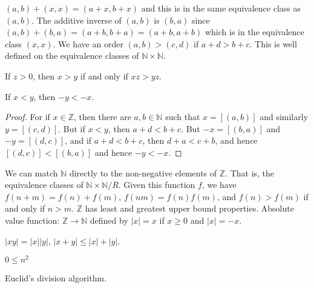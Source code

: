 \documentclass{book}                                                           %
\begin{document}
        $(a,b)+(x,x)=(a+x,b+x)$ and this is in the same equivalence class as
        $(a,b)$. The additive inverse of $(a,b)$ is $(b,a)$ since
        $(a,b)+(b,a)=(a+b,b+a)=(a+b,a+b)$ which is in the equivalence class
        $(x,x)$. We have an order $(a,b)>(c,d)$ if $a+d>b+c$. This is well
        defined on the equivalence classes of $\mathbb{N}\times\mathbb{N}$.
        \begin{theorem}
            If $z>0$, then $x>y$ if and only if $xz>yz$.
        \end{theorem}
        \begin{theorem}
            If $x<y$, then $\minus{y}<\minus{x}$.
        \end{theorem}
        \begin{proof}
            For if $x\in\mathbb{Z}$, then there are $a,b\in\mathbb{N}$ such
            that $x=[(a,b)]$ and similarly $y=[(c,d)]$. But if
            $x<y$, then $a+d<b+c$. But $\minus{x}=[(b,a)]$ and
            $\minus{y}=[(d,c)]$, and if $a+d<b+c$, then $d+a<c+b$, and hence
            $[(d,c)]<[(b,a)]$ and hence $\minus{y}<\minus{x}$.
        \end{proof}
        We can match $\mathbb{N}$ directly to the non-negative elements of
        $\mathbb{Z}$. That is, the equivalence classes of
        $\mathbb{N}\times\mathbb{N}/R$. Given this function $f$, we have
        $f(n+m)=f(n)+f(m)$, $f(nm)=f(n)f(m)$, and $f(n)>f(m)$ if and only if
        $n>m$. $\mathbb{Z}$ has least and greatest upper bound properties.
        Absolute value function: $\mathbb{Z}\rightarrow\mathbb{N}$ defined
        by $|x|=x$ if $x\geq{0}$ and $|x|=\minus{x}$.
        \begin{theorem}
            $|xy|=|x||y|$, $|x+y|\leq|x|+|y|$.
        \end{theorem}
        \begin{theorem}
            $0\leq{n}^{2}$
        \end{theorem}
        Euclid's division algorithm.
\end{document}
